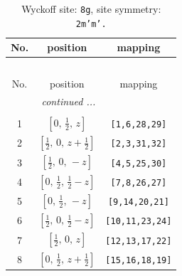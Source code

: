 \documentclass[fleqn,8pt]{jsarticle}
\begin{document}
\begin{longtable}{ccc}
\caption{Wyckoff site: {\tt 8g}, site symmetry: {\tt 2m'm'.}}
 \\
 \hline \hline
No. & position & mapping \\ \hline \endfirsthead

\multicolumn{2}{l}{\tablename\ \thetable{}} \\
 \hline \hline
No. & position & mapping \\ \hline \endhead

 \hline \hline
\multicolumn{2}{r}{\footnotesize\it continued ...} \\ \endfoot

 \hline \hline
\multicolumn{2}{r}{} \\ \endlastfoot

1 & $\left[ 0,\, \frac{1}{2},\, z \right]$ & {\tt [1,6,28,29]} \\ \hline
2 & $\left[ \frac{1}{2},\, 0,\, z + \frac{1}{2} \right]$ & {\tt [2,3,31,32]} \\ \hline
3 & $\left[ \frac{1}{2},\, 0,\, - z \right]$ & {\tt [4,5,25,30]} \\ \hline
4 & $\left[ 0,\, \frac{1}{2},\, \frac{1}{2} - z \right]$ & {\tt [7,8,26,27]} \\ \hline
5 & $\left[ 0,\, \frac{1}{2},\, - z \right]$ & {\tt [9,14,20,21]} \\ \hline
6 & $\left[ \frac{1}{2},\, 0,\, \frac{1}{2} - z \right]$ & {\tt [10,11,23,24]} \\ \hline
7 & $\left[ \frac{1}{2},\, 0,\, z \right]$ & {\tt [12,13,17,22]} \\ \hline
8 & $\left[ 0,\, \frac{1}{2},\, z + \frac{1}{2} \right]$ & {\tt [15,16,18,19]} \\
\end{longtable}
\renewcommand{\arraystretch}{1.2}
\end{document}
